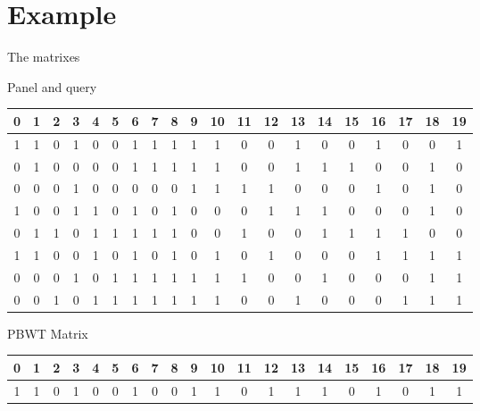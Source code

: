 \documentclass{beamer}
\begin{document}
\section{Example}
\begin{frame}{The matrixes}
  \begin{block}{Panel and query}
    \begin{table}[H]
      \centering
      \tiny
      \begin{tabular}{c|c|c|c|c|c|c|c|c|c|c|c|c|c|c|c|c|c|c|c}
        \hline
        0 & 1 & 2 & 3 & 4 & 5 & 6 & 7 & 8 & 9 & 10 & 11 & 12 & 13 & 14 & 15 & 16
        & 17 & 18 & 19\\
        \hline
        \hline
        
        1 & 1 & 0 & 1 & 0 & 0 & 1 & 1 & 1 & 1 & 1 & 0 & 0 & 1 & 0 & 0 & 1 & 0
             & 0 & 1\\
        0 & 1 & 0 & 0 & 0 & 0 & 1 & 1 & 1 & 1 & 1 & 0 & 0 & 1 & 1 & 1 & 0 & 0
             & 1 & 0\\
        0 & 0 & 0 & 1 & 0 & 0 & 0 & 0 & 0 & 1 & 1 & 1 & 1 & 0 & 0 & 0 & 1 & 0
             & 1 & 0\\
        1 & 0 & 0 & 1 & 1 & 0 & 1 & 0 & 1 & 0 & 0 & 0 & 1 & 1 & 1 & 0 & 0 & 0
             & 1 & 0\\
        0 & 1 & 1 & 0 & 1 & 1 & 1 & 1 & 1 & 0 & 0 & 1 & 0 & 0 & 1 & 1 & 1 & 1
             & 0 & 0\\
        1 & 1 & 0 & 0 & 1 & 0 & 1 & 0 & 1 & 0 & 1 & 0 & 1 & 0 & 0 & 0 & 1 & 1
             & 1 & 1\\
        0 & 0 & 0 & 1 & 0 & 1 & 1 & 1 & 1 & 1 & 1 & 1 & 0 & 0 & 1 & 0 & 0 & 0
             & 1 & 1\\
        \hline
        \hline
        \hline
        0 & 0 & 1 & 0 & 1 & 1 & 1 & 1 & 1 & 1 & 1 & 0 & 0 & 1 & 0 & 0 & 0 & 1
             & 1 & 1
      \end{tabular}
    \end{table}
  \end{block}
  \begin{block}{PBWT Matrix}
    \begin{table}[H]
      \centering
      \tiny
      \begin{tabular}{c|c|c|c|c|c|c|c|c|c|c|c|c|c|c|c|c|c|c|c}
        \hline
        0 & 1 & 2 & 3 & 4 & 5 & 6 & 7 & 8 & 9 & 10 & 11 & 12 & 13 & 14 & 15 & 16
        & 17 & 18 & 19\\
        \hline
        \hline
        1 & 1 & 0 & 1 & 0 & 0 & 1 & 0 & 0 & 1 & 1 & 0 & 1 & 1 & 1 & 0 & 1 & 0
             & 1 & 1 \\

\end{tabular}
\end{table}
\end{block}
\end{frame}
\end{document}

